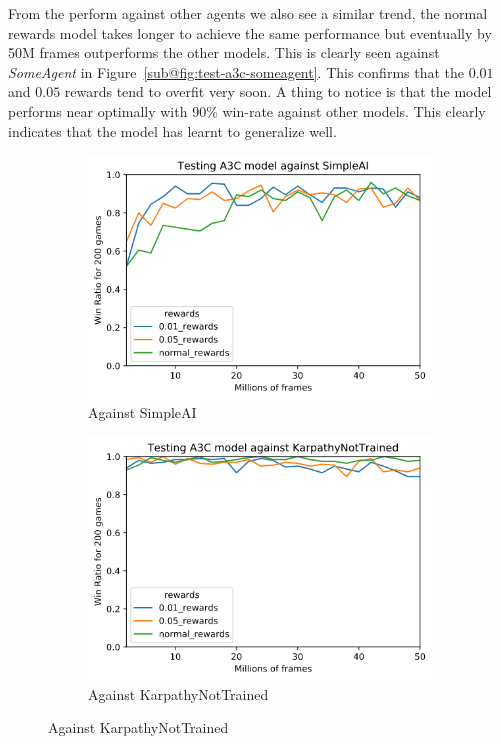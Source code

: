 \medskip
\noindent
From the perform against other agents we also see a similar trend, the normal rewards model takes longer to achieve the same performance but eventually by 50M frames outperforms the other models. This is clearly seen against \textit{SomeAgent} in Figure~\ref{sub@fig:test-a3c-someagent}. This confirms that the $0.01$ and $0.05$ rewards tend to overfit very soon. A thing to notice is that the model performs near optimally with 90\% win-rate against other models. This clearly indicates that the model has learnt to generalize well. 
\begin{figure}[th!]
    \centering
    \begin{subfigure}{0.49\textwidth}
        \centering
        \includegraphics[width=\textwidth]{figures/a3c-test-simpleai.png}
        \caption{Against SimpleAI}
        \label{fig:test-a3c-simpleai}
    \end{subfigure}
    \begin{subfigure}{0.49\textwidth}
        \centering
        \includegraphics[width=\textwidth]{figures/a3c-test-karpathy-not-trained.png}
        \caption{Against KarpathyNotTrained}
        \label{fig:test-a3c-karpathy}
    \end{subfigure}


\end{figure}
